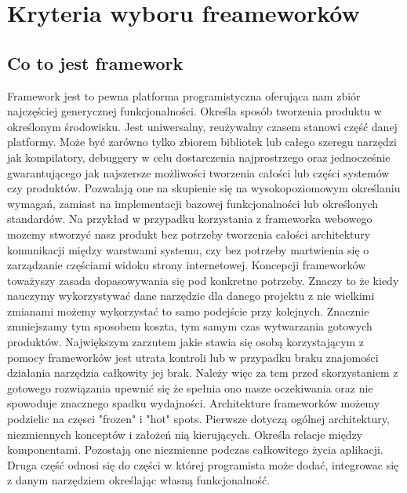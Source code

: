 \documentclass[12pt]{report}
\begin{document}
\chapter{Kryteria wyboru freameworków}

  \section{Co to jest framework}
    Framework jest to pewna platforma programistyczna oferująca nam zbiór najczęściej generycznej funkcjonalności.
    Określa sposób tworzenia produktu w określonym środowisku.
    Jest uniwersalny, reużywalny czasem stanowi część danej platformy.
    Może być zarówno tylko zbiorem bibliotek lub całego szeregu narzędzi jak kompilatory, debuggery w celu dostarczenia najprostrzego oraz jednocześnie gwarantującego jak najszersze możliwości tworzenia całości lub części systemów czy produktów.
    Pozwalają one na skupienie się na wysokopoziomowym określaniu wymagań, zamiast na implementacji bazowej funkcjonalności lub określonych standardów. 
    Na przykład w przypadku korzystania z frameworka webowego mozemy stworzyć nasz produkt bez potrzeby tworzenia całości architektury komunikacji między warstwami systemu, czy bez potrzeby martwienia się o zarządzanie częściami widoku strony internetowej.
    Koncepcji frameworków toważyszy zasada dopasowywania się pod konkretne potrzeby.
    Znaczy to że kiedy nauczymy wykorzystywać dane narzędzie dla danego projektu z nie wielkimi zmianami możemy wykorzystać to samo podejście przy kolejnych.
    Znacznie zmniejszamy tym sposobem koszta, tym samym czas wytwarzania gotowych produktów.
    Największym zarzutem jakie stawia się osobą korzystającym z pomocy frameworków jest utrata kontroli lub w przypadku braku znajomości działania narzędzia całkowity jej brak.
    Należy więc za tem przed skorzystaniem z gotowego rozwiązania upewnić się że spełnia ono nasze oczekiwania oraz nie spowoduje znacznego spadku wydajności.
    Architekture frameworków możemy podzielic na częsci "frozen" i "hot" spots.
    Pierwsze dotyczą ogólnej architektury, niezmiennych konceptów i założeń nią kierujących.
    Określa relacje między komponentami.
    Pozostają one niezmienne podczas całkowitego życia aplikacji.
    Druga część odnosi się do części w której programista może dodać, integrowac się z danym narzędziem określając własną funkcjonalność.
\end{document}
